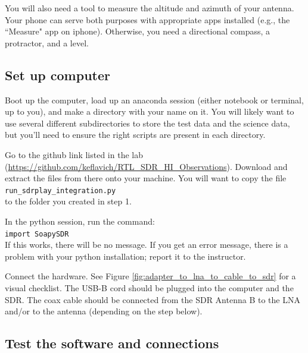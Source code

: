 \documentclass[11pt]{article}
\begin{document}
You will also need a tool to measure the altitude and azimuth of your antenna.
Your phone can serve both purposes with appropriate apps installed (e.g., the ``Measure" app on iphone).
Otherwise, you need a directional compass, a protractor, and a level.



\subsection{Set up computer}
\label{sec:computer}
Boot up the computer, load up an anaconda session (either notebook or terminal,
up to you), and make a directory with your name on it.  You will likely want to
use several different subdirectories to store the test data and the science
data, but you'll need to ensure the right scripts are present in each
directory.

Go to the github link listed in the lab
(\url{https://github.com/keflavich/RTL_SDR_HI_Observations}). Download and
extract the files from there onto your machine. You will want to copy the file\\
\verb|run_sdrplay_integration.py|  \\
to the
folder you created in step 1.

In the python session, run the command: \\
\verb|import SoapySDR|\\
If this works, there will be no message.  If you get an error message, there is
a problem with your python installation; report it to the instructor.


Connect the hardware.
See Figure \ref{fig:adapter_to_lna_to_cable_to_sdr} for a visual checklist.
The USB-B cord should be plugged into the computer and the SDR.
The coax cable should be connected from the SDR Antenna B to the LNA and/or to the antenna (depending on the step below).






\subsection{Test the software and connections}
\end{document}
